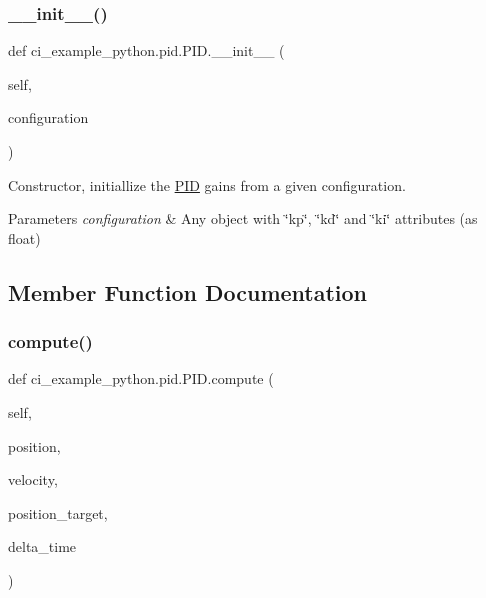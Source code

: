 \subsubsection{\texorpdfstring{\+\_\+\+\_\+init\+\_\+\+\_\+()}{\_\_init\_\_()}}
{\footnotesize\ttfamily def ci\+\_\+example\+\_\+python.\+pid.\+P\+I\+D.\+\_\+\+\_\+init\+\_\+\+\_\+ (\begin{DoxyParamCaption}\item[{}]{self,  }\item[{}]{configuration }\end{DoxyParamCaption})}



Constructor, initiallize the \hyperlink{classci__example__python_1_1pid_1_1PID}{P\+ID} gains from a given configuration. 


\begin{DoxyParams}{Parameters}
{\em configuration} & Any object with \char`\"{}kp\char`\"{}, \char`\"{}kd\char`\"{} and \char`\"{}ki\char`\"{} attributes (as float) \\
\hline
\end{DoxyParams}


\subsection{Member Function Documentation}
\mbox{\label{classci__example__python_1_1pid_1_1PID_aca3a513839029dd9cd7f46cff130c4ab}} 
\subsubsection{\texorpdfstring{compute()}{compute()}}
{\footnotesize\ttfamily def ci\+\_\+example\+\_\+python.\+pid.\+P\+I\+D.\+compute (\begin{DoxyParamCaption}\item[{}]{self,  }\item[{}]{position,  }\item[{}]{velocity,  }\item[{}]{position\+\_\+target,  }\item[{}]{delta\+\_\+time }\end{DoxyParamCaption})}



